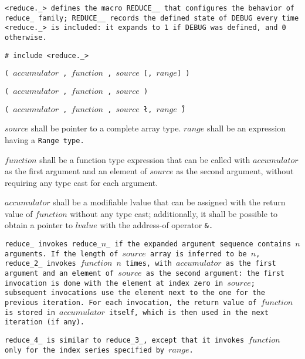 \tt{<reduce._>} defines the macro  \tt{REDUCE__} that configures the
behavior of \tt{reduce_} family; \tt{REDUCE__} records the \tt{defined}
state of \tt{DEBUG} every time \tt{<reduce._>} is included:
it expands to \tt{1} if \tt{DEBUG} was defined, and \tt{0} otherwise.


\tt{# include <reduce._>}

\s\s\s\tt{(} $accumulator$ \tt{,}
$function$ \tt{,} $source$ [\tt{,} $range$] \tt{)}

\s\tt{(} $accumulator$ \tt{,}
$function$ \tt{,} $source$ \tt{)}

\s\tt{(} $accumulator$ \tt{,}
$function$ \tt{,} $source$ \l\tt{,} $range$\r\ \tt{)}


$source$ shall be pointer to a complete array type.
$range$  shall be an expression having a \tt{Range} type.

$function$ shall be a function type expression that can be called with
$accumulator$ as the first argument and an element of $source$ as the
second argument, without requiring any type cast for each argument.

$accumulator$ shall be a modifiable lvalue that can be assigned with the
return value of $function$ without any type cast; additionally, it shall be
possible to obtain a pointer to $lvalue$ with the address-of operator \tt{&}.


\tt{reduce_} invokes \tt{reduce_}$n$\_ if the
expanded argument sequence contains $n$ arguments.
If the length of $source$ array is inferred to be $n$, \tt{reduce_2_}
invokes $function$ $n$ times, with $accumulator$ as the first argument
and an element of $source$ as the second argument: the first invocation
is done with the element at index zero in $source$; subsequent
invocations use the element next to the one for the previous iteration.
For each invocation, the return value of $function$ is stored in
$accumulator$ itself, which is then used in the next iteration (if any).

\tt{reduce_4_} is similar to \tt{reduce_3_}, except that it invokes
$function$ only for the index series specified by $range$.
